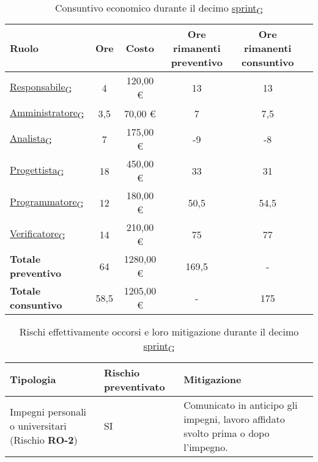 \newpage
{}
\begin{table}[!h]
    \centering
    \begin{tabular}{ | l | c | c | c | c | c | }
        \hline
        \textbf{Ruolo} & \textbf{Ore} & \textbf{Costo} & \textbf{Ore rimanenti preventivo} & \textbf{Ore rimanenti consuntivo} \\
        \hline
        \href{https://7last.github.io/docs/pb/documentazione-interna/glossario\#responsabile}{Responsabile\textsubscript{G}}     &  4   &  120,00 € &  13   &  13   \\
        \href{https://7last.github.io/docs/pb/documentazione-interna/glossario\#amministratore}{Amministratore\textsubscript{G}} &  3,5 &   70,00 € &   7   &   7,5 \\
        \href{https://7last.github.io/docs/pb/documentazione-interna/glossario\#analista}{Analista\textsubscript{G}}             &  7   &  175,00 € &  -9   &  -8   \\
        \href{https://7last.github.io/docs/pb/documentazione-interna/glossario\#progettista}{Progettista\textsubscript{G}}       & 18   &  450,00 € &  33   &  31   \\
        \href{https://7last.github.io/docs/pb/documentazione-interna/glossario\#programmatore}{Programmatore\textsubscript{G}}   & 12   &  180,00 € &  50,5 &  54,5 \\
        \href{https://7last.github.io/docs/pb/documentazione-interna/glossario\#verificatore}{Verificatore\textsubscript{G}}     & 14   &  210,00 € &  75   &  77   \\
        \hline
        \textbf{Totale preventivo} & 64   & 1280,00 € & 169,5 &   -   \\
        \hline
        \textbf{Totale consuntivo} & 58,5 & 1205,00 € &   -   & 175   \\
        \hline
    \end{tabular}
    \caption{Consuntivo economico durante il decimo \href{https://7last.github.io/docs/pb/documentazione-interna/glossario\#sprint}{sprint\textsubscript{G}}}
\end{table}

\begin{table}[!h]
    \centering
    \begin{tabular}{ | p{6cm} | p{2.5cm} | p{7.5cm} | }
        \hline
        \textbf{Tipologia} & \textbf{Rischio preventivato} & \textbf{Mitigazione}  \\
        \hline
        Impegni personali o universitari (Rischio \textbf{RO-2})& SI & Comunicato in anticipo gli impegni, lavoro affidato svolto prima o dopo l'impegno.\\
        \hline
    \end{tabular}
    \caption{Rischi effettivamente occorsi e loro mitigazione durante il decimo \href{https://7last.github.io/docs/pb/documentazione-interna/glossario\#sprint}{sprint\textsubscript{G}}}
\end{table}


